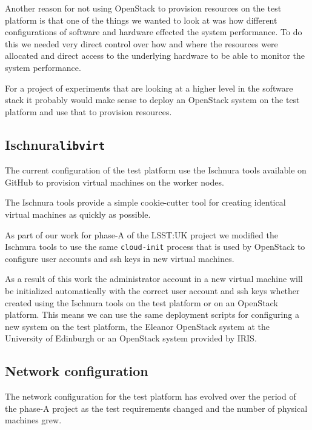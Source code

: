 \documentclass{article}
\newcommand{\openstack} {OpenStack\xspace}
\newcommand{\eleanor} {Eleanor\xspace}
\newcommand{\ischnura} {Ischnura\xspace}
\newcommand{\libvirt} {\texttt{libvirt}\xspace}
\newcommand{\cloudinit} {\texttt{cloud-init}\xspace}
\newcommand{\github} {GitHub\xspace}
\newcommand{\phasea} {phase-A\xspace}
\newcommand{\lsstuk} {LSST:UK\xspace}
\newcommand{\iris} {IRIS\xspace}
\newcommand{\uedin} {University of Edinburgh\xspace}
\newcommand{\testplatform} {test platform\xspace}
\begin{document}
Another reason for not using \openstack to provision resources on the \testplatform is that one of the things we wanted to look at was how different configurations of software and hardware effected the system performance. To do this we needed very direct control over how and where the resources were allocated and direct access to the underlying hardware to be able to monitor the system performance. 

For a project of experiments that are looking at a higher level in the software stack it probably would make sense to deploy an \openstack system on the \testplatform and use that to provision resources.

\subsection{\ischnura \libvirt}
\label{deployment.ischnura-libvirt}

The current configuration of the \testplatform use the  \ischnura tools available on \github to provision virtual machines on the worker nodes.

The \ischnura tools provide a simple cookie-cutter tool for creating identical virtual machines as quickly as possible.

As part of our work for \phasea of the \lsstuk project we modified the \ischnura tools to use the same  \cloudinit process that is used by \openstack to configure user accounts and ssh keys in new virtual machines.

As a result of this work the administrator account in a new virtual machine will be initialized automatically with the correct user account and ssh keys whether created using the \ischnura tools on the \testplatform or on an \openstack platform.
This means we can use the same deployment scripts for configuring a new system on the \testplatform, the \eleanor \openstack system at the \uedin or an \openstack system provided by \iris.

\subsection{Network configuration}
\label{deployment-testbed.network-layers}

The network configuration for the \testplatform has evolved over the period of the \phasea project as the test requirements changed and the number of physical machines grew. 
\end{document}
